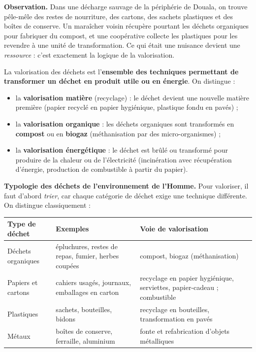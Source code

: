 \documentclass[11pt]{article}
\newcommand{\cle}[1]{{\popxbold\color{popdark}#1}}
\newcounter{popsec}
\newcounter{popsub}
\newcommand{\courssub}[1]{%
  \stepcounter{popsub}%
  \par\vspace{9pt}\noindent{\popxbold\fontsize{11.5}{13}\selectfont\color{popink}{\color{poporange}\thepopsec.\thepopsub}\hspace{6pt}#1}\par\nopagebreak\vspace{4pt}
}
\begin{document}
\courssub{La valorisation des déchets}

\textbf{Observation.} Dans une décharge sauvage de la périphérie de Douala, on trouve pêle-mêle des restes de nourriture, des cartons, des sachets plastiques et des boîtes de conserve. Un maraîcher voisin récupère pourtant les déchets organiques pour fabriquer du compost, et une coopérative collecte les plastiques pour les revendre à une unité de transformation. Ce qui était une nuisance devient une \emph{ressource} : c'est exactement la logique de la valorisation.

\begin{definition}
La \cle{valorisation des déchets} est l'\textbf{ensemble des techniques permettant de transformer un déchet en produit utile ou en énergie}. On distingue :
\begin{itemize}
\item la \textbf{valorisation matière} (recyclage) : le déchet devient une nouvelle matière première (papier recyclé en papier hygiénique, plastique fondu en pavés) ;
\item la \textbf{valorisation organique} : les déchets organiques sont transformés en \textbf{compost} ou en \textbf{biogaz} (méthanisation par des micro-organismes) ;
\item la \textbf{valorisation énergétique} : le déchet est brûlé ou transformé pour produire de la chaleur ou de l'électricité (incinération avec récupération d'énergie, production de combustible à partir du papier).
\end{itemize}
\end{definition}

\textbf{Typologie des déchets de l'environnement de l'Homme.} Pour valoriser, il faut d'abord \emph{trier}, car chaque catégorie de déchet exige une technique différente. On distingue classiquement :

\begin{center}
\begin{tabularx}{\linewidth}{|l|X|X|}\hline
\rowcolor{popblueL} \textbf{Type de déchet} & \textbf{Exemples} & \textbf{Voie de valorisation} \\ \hline
Déchets organiques & épluchures, restes de repas, fumier, herbes coupées & compost, biogaz (méthanisation) \\ \hline
Papiers et cartons & cahiers usagés, journaux, emballages en carton & recyclage en papier hygiénique, serviettes, papier-cadeau ; combustible \\ \hline
Plastiques & sachets, bouteilles, bidons & recyclage en bouteilles, transformation en pavés \\ \hline
Métaux & boîtes de conserve, ferraille, aluminium & fonte et refabrication d'objets métalliques \\ \hline
\end{tabularx}
\end{center}
\end{document}
